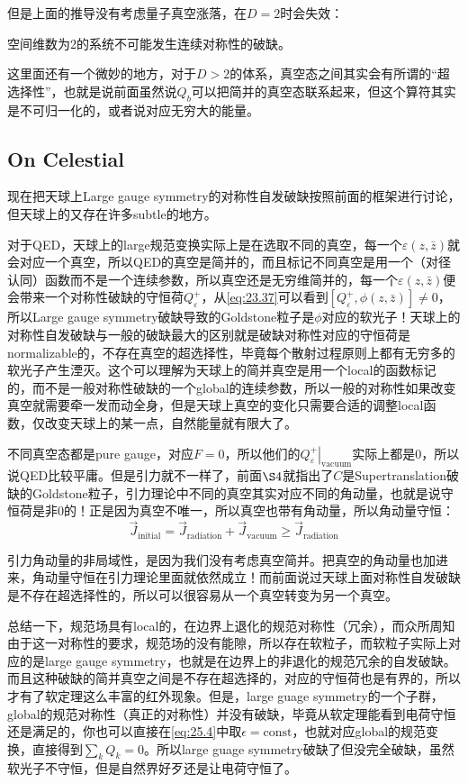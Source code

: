 但是上面的推导没有考虑量子真空涨落，在$D=2$时会失效：
\begin{theorem}
	空间维数为2的系统不可能发生连续对称性的破缺。
\end{theorem}
这里面还有一个微妙的地方，对于$D>2$的体系，真空态之间其实会有所谓的“超选择性”，也就是说前面虽然说$Q_b$可以把简并的真空态联系起来，但这个算符其实是不可归一化的，或者说对应无穷大的能量。
\subsection{On Celestial}
现在把天球上Large gauge symmetry的对称性自发破缺按照前面的框架进行讨论，但天球上的又存在许多subtle的地方。

对于QED，天球上的large规范变换实际上是在选取不同的真空，每一个$\varepsilon(z,\bar z)$就会对应一个真空，所以QED的真空是简并的，而且标记不同真空是用一个（对径认同）函数而不是一个连续参数，所以真空还是无穷维简并的，每一个$\varepsilon(z,\bar z)$便会带来一个对称性破缺的守恒荷$Q^+_\varepsilon$，从\ref{eq:23.37}可以看到$\left[Q_{\varepsilon}^{+},\phi(z,\bar{z})\right]\neq 0$，所以Large gauge symmetry破缺导致的Goldstone粒子是$\phi$对应的软光子！天球上的对称性自发破缺与一般的破缺最大的区别就是破缺对称性对应的守恒荷是normalizable的，不存在真空的超选择性，毕竟每个散射过程原则上都有无穷多的软光子产生湮灭。这个可以理解为天球上的简并真空是用一个local的函数标记的，而不是一般对称性破缺的一个global的连续参数，所以一般的对称性如果改变真空就需要牵一发而动全身，但是天球上真空的变化只需要合适的调整local函数，仅改变天球上的某一点，自然能量就有限大了。

不同真空态都是pure gauge，对应$F=0$，所以他们的$\left.Q^+_\varepsilon\right|_{\mathrm{vacuum}}$实际上都是0，所以说QED比较平庸。但是引力就不一样了，前面$\S 4$就指出了$C$是Supertranslation破缺的Goldstone粒子，引力理论中不同的真空其实对应不同的角动量，也就是说守恒荷是非0的！正是因为真空不唯一，所以真空也带有角动量，所以角动量守恒：
\begin{equation}
	\vec J_{\mathrm{initial}}=\vec J_{\mathrm{radiation}}+\vec J_{\mathrm{vacuum}}\geq \vec{J}_{\mathrm{radiation}}
\end{equation}

引力角动量的非局域性，是因为我们没有考虑真空简并。把真空的角动量也加进来，角动量守恒在引力理论里面就依然成立！而前面说过天球上面对称性自发破缺是不存在超选择性的，所以可以很容易从一个真空转变为另一个真空。

总结一下，规范场具有local的，在边界上退化的规范对称性（冗余），而众所周知由于这一对称性的要求，规范场的没有能隙，所以存在软粒子，而软粒子实际上对应的是large gauge symmetry，也就是在边界上的非退化的规范冗余的自发破缺。而且这种破缺的简并真空之间是不存在超选择的，对应的守恒荷也是有界的，所以才有了软定理这么丰富的红外现象。但是，large guage symmetry的一个子群，global的规范对称性（真正的对称性）并没有破缺，毕竟从软定理能看到电荷守恒还是满足的，你也可以直接在\ref{eq:25.4}中取$\epsilon=\mathrm{const}$，也就对应global的规范变换，直接得到$\sum_k Q_k=0$。所以large guage symmetry破缺了但没完全破缺，虽然软光子不守恒，但是自然界好歹还是让电荷守恒了。


